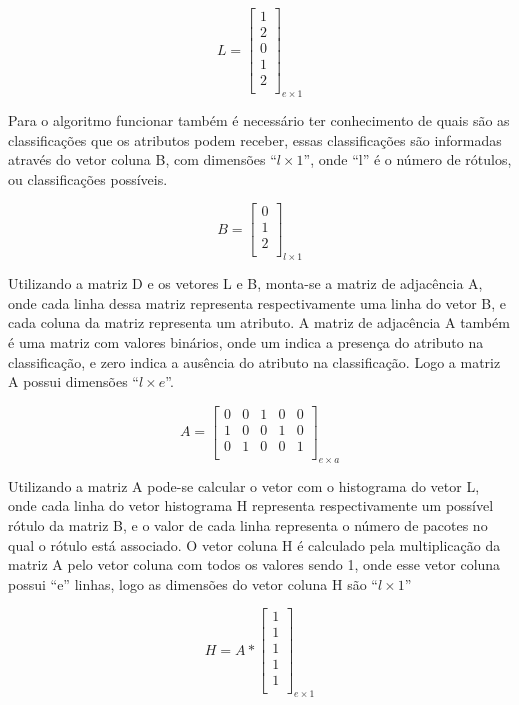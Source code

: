 $$L=\left[
\begin{array}{c}
1 \\
2 \\
0 \\
1 \\
2 \\
\end{array}
\right]_{e \times 1}$$

Para o algoritmo funcionar também é necessário ter conhecimento de quais são as
classificações que os atributos podem receber, essas classificações são informadas
através do vetor coluna B, com dimensões ``${l \times 1}$'', onde ``l'' é o número
de rótulos, ou classificações possíveis.

$$B=\left[
\begin{array}{c}
0 \\
1 \\
2 \\
\end{array}
\right]_{l \times 1}$$

Utilizando a matriz D e os vetores L e B, monta-se a matriz de adjacência A, onde
cada linha dessa matriz representa respectivamente uma linha do vetor B, e cada
coluna da matriz representa um atributo. A matriz de adjacência A também é uma
matriz com valores binários, onde um indica a presença do atributo na classificação,
e zero indica a ausência do atributo na classificação. Logo a matriz A possui
dimensões ``${l \times e}$''.

$$A=\left[
\begin{array}{ccccc}
0 & 0 & 1 & 0 & 0 \\
1 & 0 & 0 & 1 & 0 \\
0 & 1 & 0 & 0 & 1 \\
\end{array}
\right]_{e \times a}$$

Utilizando a matriz A pode-se calcular o vetor com o histograma do vetor L, onde
cada linha do vetor histograma H representa respectivamente um possível rótulo da
matriz B, e o valor de cada linha representa o número de pacotes no qual o rótulo
está associado. O vetor coluna H é calculado pela multiplicação da matriz A pelo
vetor coluna com todos os valores sendo 1, onde esse vetor coluna possui ``e''
linhas, logo as dimensões do vetor coluna H são ``${l \times 1}$''

$$H=A * \left[
\begin{array}{c}
1 \\
1 \\
1 \\
1 \\
1 \\
\end{array}
\right]_{e \times 1}$$

